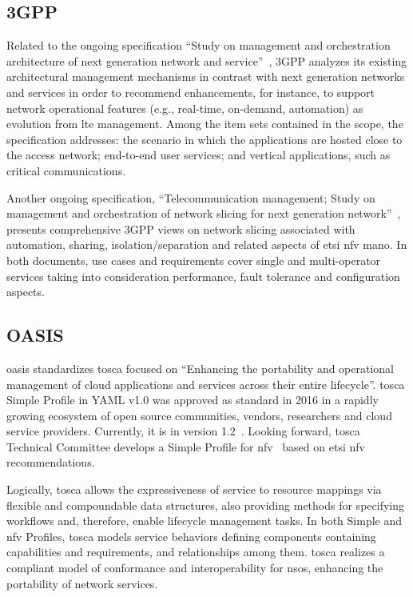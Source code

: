 \subsection{3GPP}
Related to the ongoing specification ``Study on management and orchestration architecture of next generation network and service''~\cite{3gppStudy:28800:2017}, 3GPP analyzes its existing architectural management mechanisms in contrast with next generation networks and services in order to recommend enhancements, for instance, to support network operational features (e.g., real-time, on-demand, automation) as evolution from \gls{lte} management. Among the item sets contained in the scope, the specification addresses: the scenario in which the applications are hosted close to the access network; end-to-end user services; and vertical applications, such as critical communications. 

Another ongoing specification, ``Telecommunication management; Study on management and orchestration of network slicing for next generation network''~\cite{3GPP2017TRNetwork}, presents comprehensive 3GPP views on network slicing associated with automation, sharing, isolation/separation and related aspects of \gls{etsi} \gls{nfv} \gls{mano}. In both documents, use cases and requirements cover single and multi-operator services taking into consideration performance, fault tolerance and configuration aspects.

\subsection{OASIS}
\gls{oasis} standardizes \gls{tosca} focused on ``Enhancing the portability and operational management of cloud applications and services across their entire lifecycle''. \gls{tosca} Simple Profile in YAML v1.0 was approved as standard in 2016 in a rapidly growing ecosystem of open source communities, vendors, researchers and cloud service providers. Currently, it is in version 1.2~\cite{OASIS2017TOSCA1.2}. Looking forward, \gls{tosca} Technical Committee develops a Simple Profile for \gls{nfv}~\cite{OASIS2017TOSCA1.0} based on \gls{etsi} \gls{nfv} recommendations. 

Logically, \gls{tosca} allows the expressiveness of service to resource mappings via flexible and compoundable data structures, also providing methods for specifying workflows and, therefore, enable lifecycle management tasks. In both Simple and \gls{nfv} Profiles, \gls{tosca} models service behaviors defining components containing capabilities and requirements, and relationships among them. \gls{tosca} realizes a compliant model of conformance and interoperability for \glspl{nso}, enhancing the portability of network services. 

